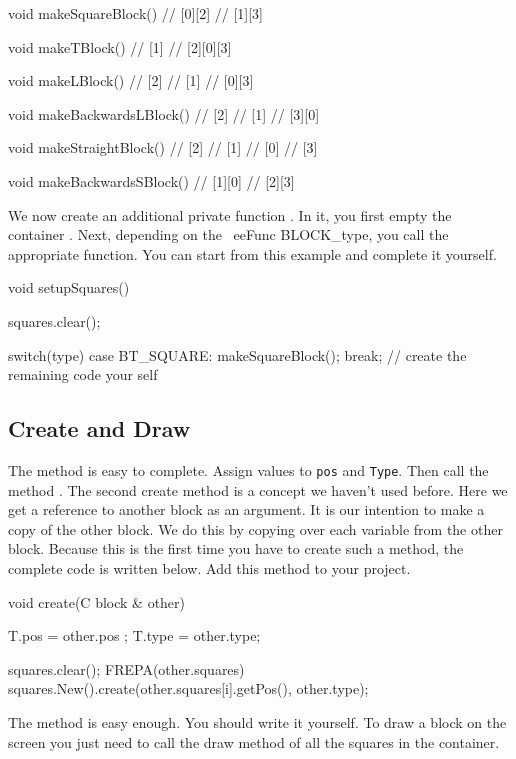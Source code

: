 \begin{code}
void makeSquareBlock()
{
	// [0][2]
	// [1][3]
}

void makeTBlock()
{
	//    [1]
	// [2][0][3]
}

void makeLBlock()
{
	// [2]
	// [1]
	// [0][3]  
}

void makeBackwardsLBlock()
{
	//    [2]
	//    [1]
	// [3][0]  
}

void makeStraightBlock()
{
	// [2]
	// [1]
	// [0]
	// [3] 
}

void makeBackwardsSBlock() 
{
	// [1][0]
	//    [2][3]
}
\end{code}

We now create an additional private function . In it, you first empty the container . Next, depending on the \ eeFunc {BLOCK\_type}, you call the appropriate function. You can start from this example and complete it yourself.

\begin{code}
void setupSquares()
{
	 squares.clear();
	
	 switch(type)
 {
	 	  case BT_SQUARE: makeSquareBlock(); break;
			// create the remaining code your self
 }
}
\end{code}

\subsection{Create and Draw}
The  method is easy to complete. Assign values to  \verb|pos| and \verb|Type|. Then call the method . The second create method is a concept we haven't used before. Here we get a reference to another block as an argument. It is our intention to make a copy of the other block. We do this by copying over each variable from the other block. Because this is the first time you have to create such a method, the complete code is written below. Add this method to your project.

\begin{code}
void create(C block & other)
{
   T.pos  = other.pos ;
   T.type = other.type;
   
   squares.clear();
   FREPA(other.squares)
   {
      squares.New().create(other.squares[i].getPos(), other.type);
   }
}
\end{code}

The  method is easy enough. You should write it yourself. To draw a block on the screen you just need to call the draw method of all the squares in the container.

